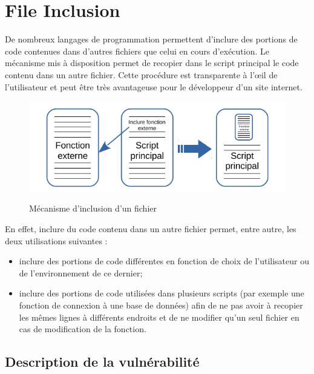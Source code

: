 
\newpage

\section{File Inclusion}

De nombreux langages de programmation permettent d'inclure des portions de code contenues dans d'autres fichiers que celui en cours d'exécution. Le mécanisme mis à disposition permet de recopier dans le script principal le code contenu dans un autre fichier. Cette procédure est transparente à l'œil de l'utilisateur et peut être très avantageuse pour le développeur d'un site internet.

\begin{figure}[!h]
\begin{center}

\label{inclusion}
\includegraphics[scale=1.2]{images/include.pdf}

\caption{Mécanisme d'inclusion d'un fichier}

\end{center}
\end{figure}

En effet, inclure du code contenu dans un autre fichier permet, entre autre, les deux utilisations suivantes :
\begin{itemize}
\item inclure des portions de code différentes en fonction de choix de l'utilisateur ou de l'environnement de ce dernier;
\item inclure des portions de code utilisées dans plusieurs scripts (par exemple une fonction de connexion à une base de données) afin de ne pas avoir à recopier les mêmes lignes à différents endroits et de ne modifier qu'un seul fichier en cas de modification de la fonction.
\end{itemize}





\subsection{Description de la vulnérabilité}

